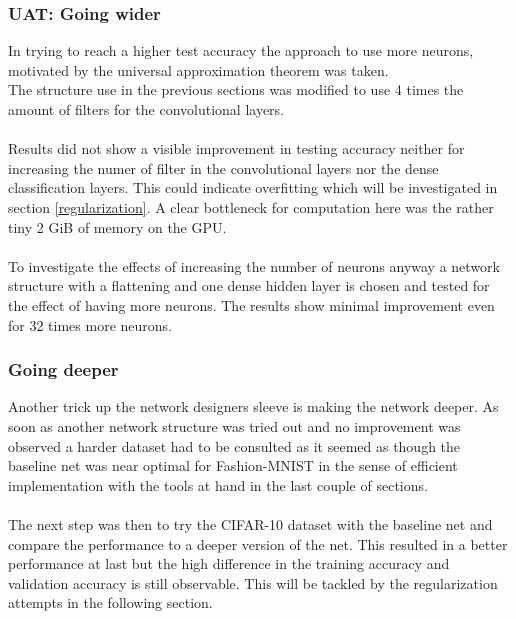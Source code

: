 \documentclass{article}
\begin{document}
\begin{multicols}{2}
\subsubsection{UAT: Going wider}
In trying to reach a higher test accuracy the approach to use more neurons, motivated by the universal approximation theorem was taken.\\
The structure use in the previous sections was modified to use 4 times the amount of filters for the convolutional layers.\\
\\
Results did not show a visible improvement in testing accuracy neither for increasing the numer of filter in the convolutional layers nor the dense classification layers. This could indicate overfitting which will be investigated in section \ref{regularization}. A clear bottleneck for computation here was the rather tiny 2 GiB of memory on the GPU.\\
\\
To investigate the effects of increasing the number of neurons anyway a network structure with a flattening and one dense hidden layer is chosen and tested for the effect of having more neurons. The results show minimal improvement even for 32 times more neurons.

\subsubsection{Going deeper}
\label{deeper}
Another trick up the network designers sleeve is making the network deeper. As soon as another network structure was tried out and no improvement was observed a harder dataset had to be consulted as it seemed as though the baseline net was near optimal for Fashion-MNIST in the sense of efficient implementation with the tools at hand in the last couple of sections.\\
\\
The next step was then to try the CIFAR-10 dataset with the baseline net and compare the performance to a deeper version of the net. This resulted in a better performance at last but the high difference in the training accuracy and validation accuracy is still observable. This will be tackled by the regularization attempts in the following section.


\end{multicols}
\end{document}
